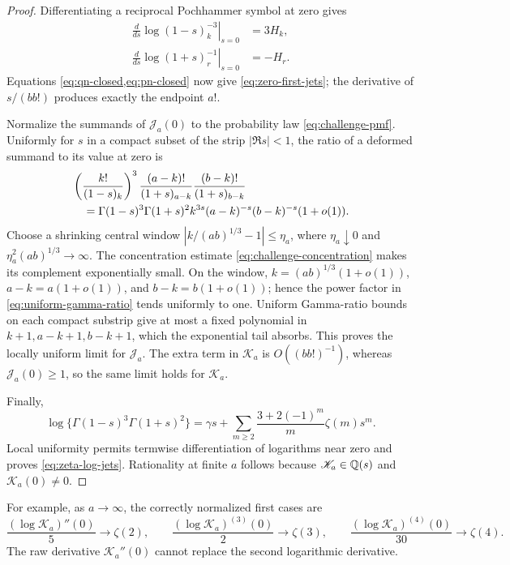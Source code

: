 \begin{proof}
Differentiating a reciprocal Pochhammer symbol at zero gives
\begin{align*}
 \left.\frac d{ds}\log(1-s)_k^{-3}\right|_{s=0}&=3H_k,\\
 \left.\frac d{ds}\log(1+s)_r^{-1}\right|_{s=0}&=-H_r.
\end{align*}
Equations \cref{eq:qn-closed,eq:pn-closed} now give
\eqref{eq:zero-first-jets}; the derivative of \(s/(bb!)\) produces exactly
the endpoint \(a!\).

Normalize the summands of \(\mathscr J_a(0)\) to the probability law
\eqref{eq:challenge-pmf}.  Uniformly for \(s\) in a compact subset of the
strip \(|\Re s|<1\), the ratio of a deformed summand to its value at zero is
 \begin{align}
 &\left(\frac{k!}{(1-s)_k}\right)^3
 \frac{(a-k)!}{(1+s)_{a-k}}
 \frac{(b-k)!}{(1+s)_{b-k}}\notag\\
 &\quad=\Gamma(1-s)^3\Gamma(1+s)^2
 k^{3s}(a-k)^{-s}(b-k)^{-s}(1+o(1)).
 \label{eq:uniform-gamma-ratio}
 \end{align}
Choose a shrinking central window
\(|k/(ab)^{1/3}-1|\le\eta_a\), where
\(\eta_a\downarrow0\) and \(\eta_a^2(ab)^{1/3}\to\infty\).
The concentration estimate \eqref{eq:challenge-concentration} makes its
complement exponentially small.  On the window,
\(k=(ab)^{1/3}(1+o(1))\), \(a-k=a(1+o(1))\), and
\(b-k=b(1+o(1))\); hence the power factor in
\eqref{eq:uniform-gamma-ratio} tends uniformly to one.  Uniform Gamma-ratio
bounds on each compact substrip give at most a fixed polynomial in
\(k+1,a-k+1,b-k+1\), which the exponential tail absorbs.  This proves the
locally uniform limit for \(\mathscr J_a\).  The extra term in
\(\mathscr K_a\) is \(O((bb!)^{-1})\), whereas
\(\mathscr J_a(0)\ge1\), so the same limit holds for \(\mathscr K_a\).

Finally,
\begin{equation}\label{eq:Gamma-log-series}
 \log\{\Gamma(1-s)^3\Gamma(1+s)^2\}
 =\gamma s+\sum_{m\ge2}\frac{3+2(-1)^m}{m}\zeta(m)s^m.
\end{equation}
Local uniformity permits termwise differentiation of logarithms near zero
and proves \eqref{eq:zeta-log-jets}.  Rationality at finite \(a\) follows
because \(\mathscr K_a\in\mathbb Q(s)\) and \(\mathscr K_a(0)\ne0\).
\end{proof}

For example, as \(a\to\infty\), the correctly normalized first cases are
\begin{equation}\label{eq:first-zeta-jets}
 \frac{(\log\mathscr K_a)''(0)}5\to\zeta(2),\qquad
 \frac{(\log\mathscr K_a)^{(3)}(0)}2\to\zeta(3),\qquad
 \frac{(\log\mathscr K_a)^{(4)}(0)}{30}\to\zeta(4).
\end{equation}
The raw derivative \(\mathscr K_a''(0)\) cannot replace the second
logarithmic derivative.


